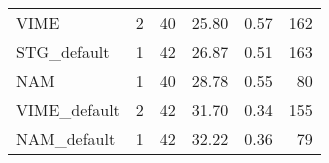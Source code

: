 \begin{tabular}{lrrrrr}
VIME                       &            2 &  40 &  25.80 &                     0.57 &   162 \\
STG_default                &            1 &  42 &  26.87 &                     0.51 &   163 \\
NAM                        &            1 &  40 &  28.78 &                     0.55 &    80 \\
VIME_default               &            2 &  42 &  31.70 &                     0.34 &   155 \\
NAM_default                &            1 &  42 &  32.22 &                     0.36 &    79 \\
\bottomrule
\end{tabular}
